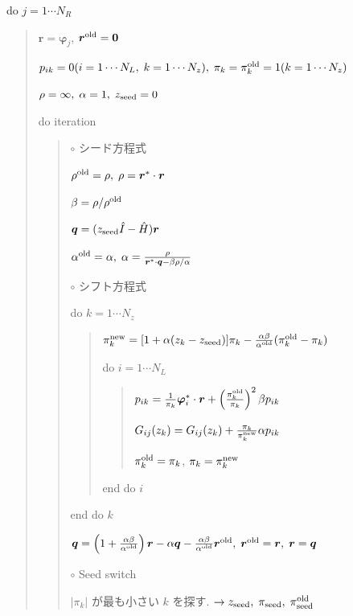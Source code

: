 \documentclass[letterpaper,10pt,dvipdfmx,openany]{sphinxmanual}
\begin{document}
do \(j = 1 \cdots N_R\)
\begin{quote}

\({\boldsymbol r} = {\boldsymbol \varphi_j}\), \({\boldsymbol r}^{\rm old} = {\bf 0}\)

\(p_{i k} = 0(i=1 \cdots N_L,\; k=1 \cdots N_z),\; \pi_k=\pi_k^{\rm old} = 1(k=1 \cdots N_z)\)

\(\rho = \infty,\; \alpha = 1,\; z_{\rm seed}=0\)

do iteration
\begin{quote}

\(\circ\) シード方程式

\(\rho^{\rm old} = \rho,\; \rho = {\boldsymbol r}^* \cdot {\boldsymbol r}\)

\(\beta = \rho / \rho^{\rm old}\)

\({\boldsymbol q} = (z_{\rm seed} {\hat I} - {\hat H}){\boldsymbol r}\)

\(\alpha^{\rm old} = \alpha,\; \alpha = \frac{\rho}{{\boldsymbol r}^* \cdot {\boldsymbol q} - \beta \rho / \alpha }\)

\(\circ\) シフト方程式

do \(k = 1 \cdots N_z\)
\begin{quote}

\(\pi_k^{\rm new} = [1+\alpha(z_k-z_{\rm seed})]\pi_k - \frac{\alpha \beta}{\alpha^{\rm old}}(\pi_k^{\rm old} - \pi_k)\)

do \(i = 1 \cdots N_L\)
\begin{quote}

\(p_{i k} = \frac{1}{\pi_k} {\boldsymbol \varphi}_i^* \cdot {\boldsymbol r} + \left(\frac{\pi^{\rm old}_k}{\pi_k } \right)^2 \beta p_{i k}\)

\(G_{i j}(z_k) = G_{i j}(z_k) + \frac{\pi_k}{\pi_k^{\rm new}} \alpha p_{i k}\)

\(\pi_k^{\rm old} = \pi_k\), \(\pi_k = \pi_k^{\rm new}\)
\end{quote}

end do \(i\)
\end{quote}

end do \(k\)

\({\boldsymbol q} = \left( 1 + \frac{\alpha \beta}{\alpha^{\rm old}} \right) {\boldsymbol r} - \alpha {\boldsymbol q} - \frac{\alpha \beta}{\alpha^{\rm old}} {\boldsymbol r}^{\rm old},\; {\boldsymbol r}^{\rm old} = {\boldsymbol r},\; {\boldsymbol r} = {\boldsymbol q}\)

\(\circ\) Seed switch

\(|\pi_k|\) が最も小さい \(k\) を探す. \(\rightarrow z_{\rm seed},\; \pi_{\rm seed},\; \pi_{\rm seed}^{\rm old}\)


\end{quote}
\end{quote}
\end{document}
